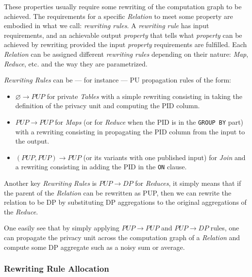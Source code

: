 \documentclass[letterpaper]{article} %
\begin{document}
These properties usually require some rewriting of the computation graph to be achieved. The requirements for a specific \emph{Relation} to meet some property are embodied in what we call: \emph{rewriting rules}.
A \emph{rewriting rule} has input requirements, and an achievable output \emph{property} that tells what \emph{property} can be achieved by rewriting provided the input \emph{property} requirements are fulfilled.
Each \emph{Relation} can be assigned different \emph{rewriting rules} depending on their nature: \emph{Map}, \emph{Reduce}, etc. and the way they are parametrized.

\emph{Rewriting Rules} can be --- for instance --- PU propagation rules of the form:
\begin{itemize}
    \item $\varnothing \rightarrow PUP$ for private \emph{Tables} with a simple rewriting consisting in taking the definition of the privacy unit and computing the PID column.
    \item $PUP \rightarrow PUP$ for \emph{Maps} (or for \emph{Reduce} when the PID is in the \texttt{GROUP BY} part) with a rewriting consisting in propagating the PID column from the input to the output.
    \item $(PUP, PUP) \rightarrow PUP$ (or its variants with one published input) for \emph{Join} and a rewriting consisting in adding the PID in the \texttt{ON} clause.
\end{itemize}

Another key \emph{Rewriting Rules} is $PUP \rightarrow DP$ for \emph{Reduces}, it simply means that if the parent of the \emph{Relation} can be rewritten as PUP, then we can rewrite the relation to be DP by substituting DP aggregations to the original aggregations of the \emph{Reduce}.

One easily see that by simply applying $PUP \rightarrow PUP$ and $PUP \rightarrow DP$ rules, one can propagate the privacy unit across the computation graph of a \emph{Relation} and compute some DP aggregate such as a noisy sum or average.

\subsubsection{Rewriting Rule Allocation}
\end{document}
